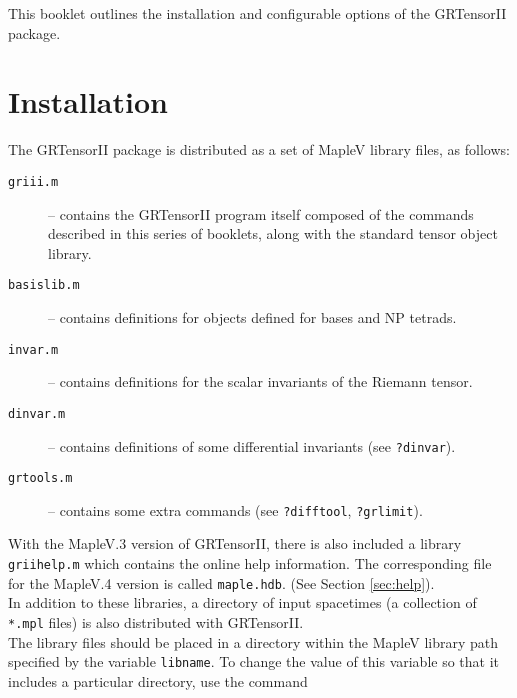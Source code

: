 \documentclass{article}
\begin{document}
\grlabel{\grSetupLabel}
\grtitle{\grSetupTitle}
\grtitlepage
\copyrightpage
This booklet outlines the installation and configurable options
of the GRTensorII package. 
%
\section{Installation} \label{sec:install}
%
The GRTensorII package is distributed as a set of MapleV library
files, as follows:
\begin{description}
  \item[\texttt{griii.m}] -- contains the GRTensorII program itself
    composed of the commands described in this series of booklets,
    along with the standard tensor object library.

  \item[\texttt{basislib.m}] -- contains definitions for objects defined
    for bases and NP tetrads.

  \item[\texttt{invar.m}] -- contains definitions for the scalar
    invariants of the Riemann tensor.

  \item[\texttt{dinvar.m}] -- contains definitions of some
    differential invariants (see \texttt{?dinvar}).

  \item[\texttt{grtools.m}] -- contains some extra commands (see
    \texttt{?difftool}, \texttt{?grlimit}).
\end{description}
With the MapleV.3 version of GRTensorII, there is also included
a library \texttt{griihelp.m} which contains the online help
information. The corresponding file for the MapleV.4 version
is called \texttt{maple.hdb}. (See Section \ref{sec:help}).\\

In addition to these libraries, a directory of input spacetimes
(a collection of \texttt{*.mpl} files) is also distributed
with GRTensorII.\\

The library files should be placed in a directory within the
MapleV library path specified by the variable \texttt{libname}.
To change the value of this variable so that it includes a
particular directory, use the command\\
\end{document}
